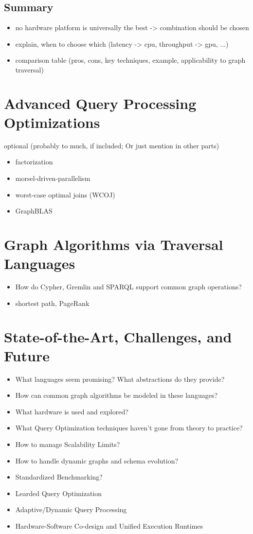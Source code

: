 \documentclass[sigconf,authordraft]{acmart}
\begin{document}
\subsection*{Summary}
\begin{itemize}
	\item no hardware platform is universally the best -> combination should be chosen
	\item explain, when to choose which (latency -> cpu, throughput -> gpu, ...)
	\item comparison table (pros, cons, key techniques, example, applicability to graph traversal)
\end{itemize}

\section{Advanced Query Processing Optimizations}
optional (probably to much, if included; Or just mention in other parts)
\begin{itemize}
	\item factorization
	\item morsel-driven-parallelism
	\item worst-case optimal joins (WCOJ)
	\item GraphBLAS
\end{itemize}

\section{Graph Algorithms via Traversal Languages}
\begin{itemize}
	\item How do Cypher, Gremlin and SPARQL support common graph operations?
	\item shortest path, PageRank
\end{itemize}

\section{State-of-the-Art, Challenges, and Future}
\begin{itemize}
	\item What languages seem promising? What abstractions do they provide?
	\item How can common graph algorithms be modeled in these languages?
	\item What hardware is used and explored?

	\item What Query Optimization techniques haven't gone from theory to practice?
	\item How to manage Scalability Limits?
	\item How to handle dynamic graphs and schema evolution?
	\item Standardized Benchmarking?

	\item Learded Query Optimization
	\item Adaptive/Dynamic Query Processing
	\item Hardware-Software Co-design and Unified Execution Runtimes
\end{itemize}
\end{document}
